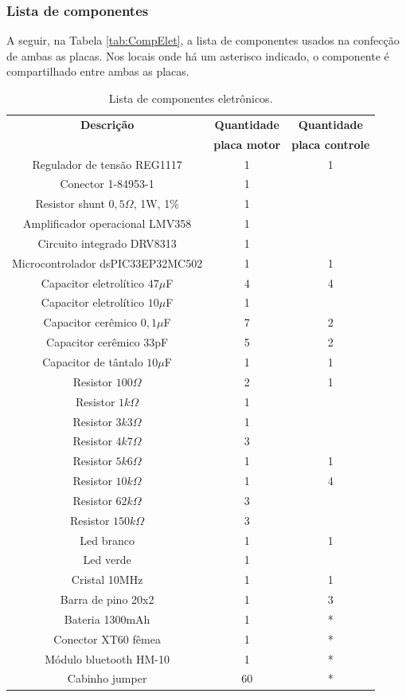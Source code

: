 \documentclass[
	12pt,				%
	openany,			%
	twoside,			%
	a4paper,			%
	english,			%
	french,				%
	spanish,			%
	brazil,				%
	oldfontcommands
	]{abntex2}
\begin{document}
\subsubsection{Lista de componentes}

A seguir, na Tabela \ref{tab:CompElet}, a lista de componentes usados na confecção de ambas as placas. Nos locais onde há um asterisco indicado, o componente é compartilhado entre ambas as placas.

\begin{table}[h]
	\caption{Lista de componentes eletrônicos.}
		\centering
	\begin{tabular}{|c|c|c|}
		\hline
		\textbf{Descrição} & \textbf{Quantidade} & \textbf{Quantidade}\\
		  & \textbf{placa motor} & \textbf{placa controle} \\
		\hline 
		Regulador de tensão REG1117 & 1 & 1 \\ 
		\hline 
		Conector  1-84953-1 & 1 & \\ 
		\hline 
		Resistor shunt $0,5\Omega$, 1W, 1\% & 1 & \\
		\hline 
		Amplificador operacional LMV358 & 1 & \\
		\hline 
		Circuito integrado DRV8313 & 1 & \\
		\hline 
		Microcontrolador dsPIC33EP32MC502 & 1 & 1 \\
		\hline 
		Capacitor eletrolítico $47\mu$F & 4 & 4 \\
		\hline
		Capacitor eletrolítico $10\mu$F & 1 & \\
		\hline
		Capacitor cerêmico $0,1\mu$F & 7 & 2 \\
		\hline
		Capacitor cerêmico 33pF & 5 & 2 \\
		\hline
		Capacitor de tântalo $10\mu$F & 1 & 1 \\
		\hline
		Resistor $100\Omega$ & 2 & 1 \\
		\hline
		Resistor $1k\Omega$ & 1 & \\
		\hline
		Resistor $3k3\Omega$ & 1 & \\
		\hline
		Resistor $4k7\Omega$ & 3 & \\
		\hline
		Resistor $5k6\Omega$ & 1 & 1 \\
		\hline
		Resistor $10k\Omega$ & 1 & 4 \\
		\hline
		Resistor $62k\Omega$ & 3 & \\
		\hline
		Resistor $150k\Omega$ & 3 & \\
		\hline
		Led branco & 1 & 1 \\
		\hline
		Led verde & 1 & \\
		\hline
		Cristal 10MHz & 1 & 1 \\
		\hline
		Barra de pino 20x2 & 1 & 3 \\
		\hline
		Bateria 1300mAh & 1 & * \\
		\hline
		Conector XT60 fêmea & 1 & * \\
		\hline
		Módulo bluetooth HM-10 & 1 & * \\
		\hline
		Cabinho jumper & 60 & * \\
		\hline
	\end{tabular}
	

\end{table}
\end{document}
